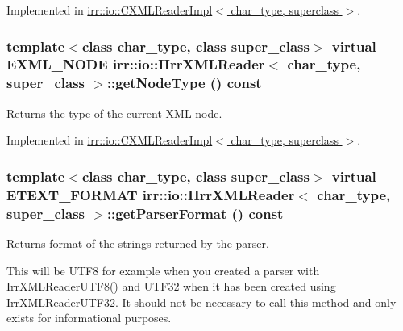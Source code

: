Implemented in \hyperlink{classirr_1_1io_1_1_c_x_m_l_reader_impl_30ddc03ee634ed0dbeef25547677f2da}{irr::io::CXMLReaderImpl$<$ char\_\-type, superclass $>$}.\hypertarget{classirr_1_1io_1_1_i_irr_x_m_l_reader_3482e8e6bdc15965fc6a0bcef6e9a8e0}{
\subsubsection[{getNodeType}]{\setlength{\rightskip}{0pt plus 5cm}template$<$class char\_\-type, class super\_\-class$>$ virtual {\bf EXML\_\-NODE} {\bf irr::io::IIrrXMLReader}$<$ char\_\-type, super\_\-class $>$::getNodeType () const}}
\label{classirr_1_1io_1_1_i_irr_x_m_l_reader_3482e8e6bdc15965fc6a0bcef6e9a8e0}


Returns the type of the current XML node. 



Implemented in \hyperlink{classirr_1_1io_1_1_c_x_m_l_reader_impl_307110843c6946fa862da1f46244aecd}{irr::io::CXMLReaderImpl$<$ char\_\-type, superclass $>$}.\hypertarget{classirr_1_1io_1_1_i_irr_x_m_l_reader_9af7e323c292a4836bf4a7c093b4d85a}{
\subsubsection[{getParserFormat}]{\setlength{\rightskip}{0pt plus 5cm}template$<$class char\_\-type, class super\_\-class$>$ virtual {\bf ETEXT\_\-FORMAT} {\bf irr::io::IIrrXMLReader}$<$ char\_\-type, super\_\-class $>$::getParserFormat () const}}
\label{classirr_1_1io_1_1_i_irr_x_m_l_reader_9af7e323c292a4836bf4a7c093b4d85a}


Returns format of the strings returned by the parser. 

This will be UTF8 for example when you created a parser with IrrXMLReaderUTF8() and UTF32 when it has been created using IrrXMLReaderUTF32. It should not be necessary to call this method and only exists for informational purposes. 

